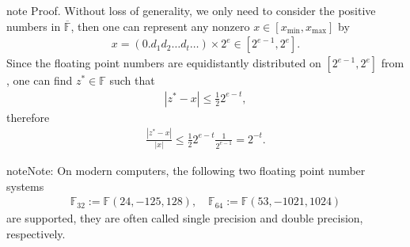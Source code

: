 \documentclass[letterpaper,10pt,english]{jupyterBook}
\begin{document}
\begin{sphinxadmonition}{note}
\sphinxAtStartPar
Proof. Without loss of generality, we only need to consider the positive numbers in \(\overline{\mathbb{F}}\), then one can represent any nonzero \(x\in [x_{\min}, x_{\max}]\) by
\begin{equation*}
\begin{split}x = (0.d_1 d_2 \dots d_t\dots)\times 2^e\in [2^{e-1}, 2^e].\end{split}
\end{equation*}
\sphinxAtStartPar
Since the floating point numbers are equidistantly distributed on \([2^{e-1}, 2^e]\) from {\hyperref[\detokenize{floating_point:THM-Di-Fl-Nu}]{}}, one can find \(z^{\ast}\in\mathbb{F}\) such that
\begin{equation*}
\begin{split}|z^{\ast} - x| \le \frac{1}{2} 2^{e-t},\end{split}
\end{equation*}
\sphinxAtStartPar
therefore
\begin{equation*}
\begin{split}\frac{|z^{\ast}- x|}{|x|}\le \frac{1}{2} 2^{e-t} \frac{1}{2^{e-1}} = 2^{-t}.\end{split}
\end{equation*}\end{sphinxadmonition}

\begin{sphinxadmonition}{note}{Note:}
\sphinxAtStartPar
On modern computers, the following two floating point number systems
\begin{equation*}
\begin{split}\mathbb{F}_{32} := \mathbb{F}(24, -125, 128),\quad\mathbb{F}_{64} := \mathbb{F}(53, -1021, 1024)\end{split}
\end{equation*}
\sphinxAtStartPar
are supported, they are often called single precision and double precision, respectively.
\end{sphinxadmonition}
\end{document}
